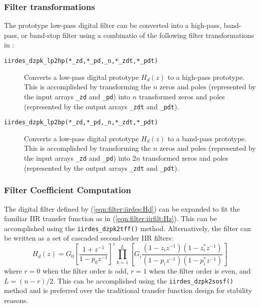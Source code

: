 \subsubsection{Filter transformations}
\label{module:filter:iirdes:transformations}
%
The prototype low-pass digital filter can be converted into a
high-pass, band-pass, or band-stop filter using a combinatio of the
following filter transformations in \liquid:
%
\begin{description}
\item[{\tt iirdes\_dzpk\_lp2hp(*\_zd,*\_pd,\_n,*\_zdt,*\_pdt)}]
    Converts a low-pass digital prototype $H_d(z)$ to a high-pass
    prototype.
    This is accomplished by transforming the $n$
    zeros and poles
    (represented by the input arrays {\tt \_zd} and {\tt \_pd})
    into $n$ transformed zeros and poles
    (represented by the output arrays {\tt \_zdt} and {\tt \_pdt}).
\item[{\tt iirdes\_dzpk\_lp2bp(*\_zd,*\_pd,\_n,*\_zdt,*\_pdt)}]
    Converts a low-pass digital prototype $H_d(z)$ to a band-pass
    prototype.
    This is accomplished by transforming the $n$
    zeros and poles
    (represented by the input arrays {\tt \_zd} and {\tt \_pd})
    into $2n$ transformed zeros and poles
    (represented by the output arrays {\tt \_zdt} and {\tt \_pdt}).
\end{description}
%

% 
%
\subsubsection{Filter Coefficient Computation}
\label{module:filter:iirdes:coefficients}
%
The digital filter defined by (\ref{eqn:filter:iirdes:Hd}) can be
expanded to fit the familiar IIR transfer function as in
(\ref{eqn:filter:iirfilt:Hz}).
This can be accomplished using the {\tt iirdes\_dzpk2tff()} method.
%
Alternatively, the filter can be written as a set of cascaded
second-order IIR filters:
%
\begin{equation}
\label{eqn:filter:iirfilt:Hd:sos}
    H_d(z) = G_0
             \left[
                \frac{1 + z^{-1}}
                     {1 - p_0 z^{-1}}
             \right]^r
             \prod_{k=1}^{L} {\left[
                G_i \frac{(1-z_iz^{-1})(1-z_i^*z^{-1})}
                         {(1-p_iz^{-1})(1-p_i^*z^{-1})}
             \right]}
\end{equation}
%
where $r=0$ when the filter order is odd, $r=1$ when the filter order is
even, and $L=(n-r)/2$.
This can be accomplished using the {\tt iirdes\_dzpk2sosf()} method and
is preferred over the traditional transfer function design for stability
reasons.

